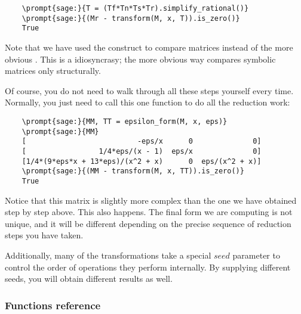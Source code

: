 \documentclass[12pt,a4paper]{article}
\begin{document}
\begin{Verbatim}
    \prompt{sage:}{T = (Tf*Tn*Ts*Tr).simplify_rational()}
    \prompt{sage:}{(Mr - transform(M, x, T)).is_zero()}
    True
\end{Verbatim}

Note that we have used the construct  to compare matrices instead of the more obvious .
This is a \sage idiosyncrasy; the more obvious way compares symbolic matrices only structurally.

Of course, you do not need to walk through all these steps yourself every time.
Normally, you just need to call this one function to do all the reduction work:

\begin{Verbatim}
    \prompt{sage:}{MM, TT = epsilon_form(M, x, eps)}
    \prompt{sage:}{MM}
    [                          -eps/x      0              0]
    [                 1/4*eps/(x - 1)  eps/x              0]
    [1/4*(9*eps*x + 13*eps)/(x^2 + x)      0  eps/(x^2 + x)]
    \prompt{sage:}{(MM - transform(M, x, TT)).is_zero()}
    True
\end{Verbatim}

Notice that this matrix is slightly more complex than the one we have obtained step by step above.
This also happens.
The final form we are computing is not unique, and it will be different depending on the precise sequence of reduction steps you have taken.

Additionally, many of the transformations take a special $seed$ parameter to control the order of operations they perform internally.
By supplying different seeds, you will obtain different results as well.

\subsubsection{Functions reference}
\end{document}

